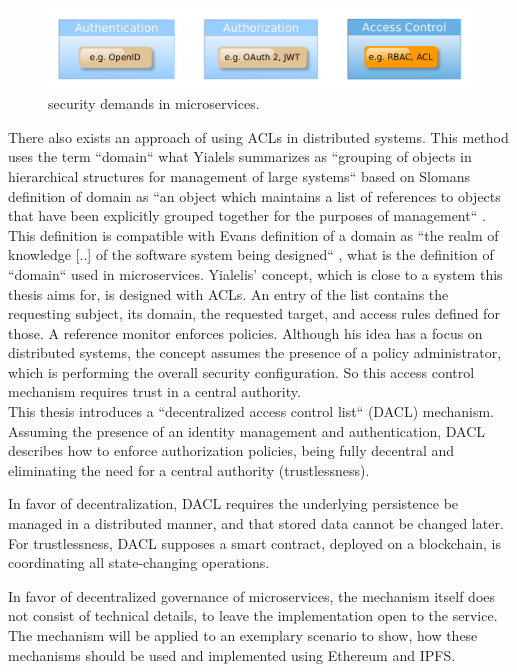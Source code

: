 \documentclass[12pt, conference]{IEEEtran}
\begin{document}
\begin{figure}[!h]
  \includegraphics[width=\linewidth]{figures/access-control.png}
  \caption{security demands in microservices.}
  \label{fig:access-control}
\end{figure}

There also exists an approach of using ACLs in distributed systems. This method uses the term ``domain`` what Yialels summarizes as ``grouping of objects in hierarchical structures for management of large systems`` \cite{b1} based on Slomans definition of domain as ``an object which maintains a list of references to objects that have been
explicitly grouped together for the purposes of management`` 
\cite{a2}. This definition is compatible with Evans definition of a domain as 
``the realm of knowledge [..] of the software system being designed`` \cite{b2}, what is the definition of ``domain`` used in microservices.  Yialelis' concept, which is close to a system this thesis aims for,  is designed with ACLs. An entry of the list contains the requesting subject, its domain, the requested target, and access rules defined for those. A reference monitor enforces policies. Although his idea has a focus on distributed systems, the concept assumes the presence of a policy administrator, which is performing the overall security configuration. So this access control mechanism requires trust in a central authority. \\

This thesis introduces a ``decentralized access control list`` (DACL) mechanism. Assuming the presence of an identity management and authentication, DACL describes how to enforce authorization policies, being fully decentral and eliminating the need for a central authority (trustlessness). 

In favor of decentralization, DACL requires the underlying persistence be managed in a distributed manner, and that stored data cannot be changed later. For trustlessness, DACL supposes a smart contract, deployed on a blockchain, is coordinating all state-changing operations.

In favor of decentralized governance of microservices, the mechanism itself does not consist of technical details, to leave the implementation open to the service. The mechanism will be applied to an exemplary scenario to show, how these mechanisms should be used and implemented using Ethereum and IPFS.
\end{document}
